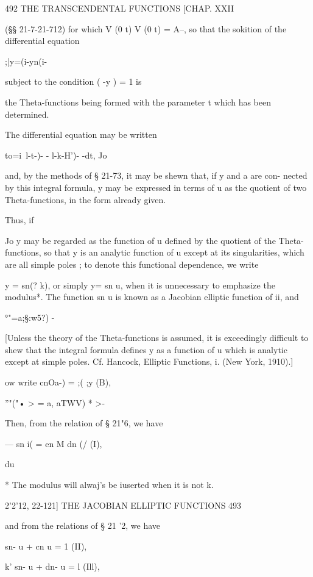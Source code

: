 492 THE TRANSCENDENTAL FUNCTIONS [CHAP. XXII 

(§§ 21-7-21-712) for which V (0 t) V (0 t) = A--, so that the sokition 
of the differential equation 

;|y=(i-yn(i-%

subject to the condition ( -y  ) = 1 is 

the Theta-functions being formed with the parameter t which has been 
determined. 

The differential equation may be written 

to=i\ l-t-)- - l-k-H')- -dt, 
Jo 

and, by the methods of § 21-73, it may be shewn that, if y and a are con- 
nected by this integral formula, y may be expressed in terms of u as the 
quotient of two Theta-functions, in the form already given. 

Thus, if 

Jo 
y may be regarded as the function of u defined by the quotient of the Theta- 
functions, so that y is an analytic function of u except at its singularities, 
which are all simple poles ; to denote this functional dependence, we write 

y = sn(?  k), 
or simply y= sn u, when it is unnecessary to emphasize the modulus*. 
The function sn u is known as a Jacobian elliptic function of ii, and 

 °"=a;§:w5?)   - 

[Unless the theory of the Theta-functions is assumed, it is exceedingly difficult to shew 
that the integral formula defines y as a function of u which is analytic except at simple 
poles. Cf. Hancock, Elliptic Functions, i. (New York, 1910).] 

 ow write cnOa-) =   ;( ;y  (B), 



''"("•   > = a, aTWV) * >- 

Then, from the relation of § 21"6, we have 

 — sn i( = en M dn (/ (I), 

du 

* The modulus will alwaj's be iuserted when it is not k. 



2'2'12, 22-121] THE JACOBIAN ELLIPTIC FUNCTIONS 493 

and from the relations of § 21 '2, we have 

sn- u + cn  u = 1 (II), 

k'  sn- u + dn- u = l (Ill), 

